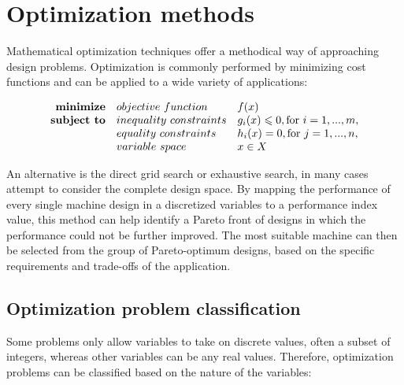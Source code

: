 \section{Optimization methods}                      \label{Chapter:background/optimization methods}
    
    
    Mathematical optimization techniques offer a methodical way of approaching design problems. Optimization is commonly performed by minimizing cost functions and can be applied to a wide variety of applications:
    
        
    \begin{equation}
        \begin{array}{rll}
            \textbf{minimize}       & \small{objective\,\,function}         & f(x)\\ 
            \textbf{subject to}     & \small{inequality\,\,constraints}     & g_i(x) \leqslant 0, \text{for } i= 1,...,m,\\ 
                                    & \small{equality\,\,constraints}       & h_i(x) = 0, \text{for } j= 1,...,n,\\ 
                                    & \small{variable\,\,space}             & x \in X
        \end{array}
    \end{equation}
    
    
    An alternative is the direct grid search or exhaustive search, in many cases attempt to consider the complete design space. By mapping the performance of every single machine design in a discretized variables to a performance index value, this method can help identify a Pareto front of designs in which the performance could not be further improved. The most suitable machine can then be selected from the group of Pareto-optimum designs, based on the specific requirements and trade-offs of the application.
    
    
    \subsection{Optimization problem classification}    \label{Chapter:background/optimization methods/optimization prob classification}

        
        Some problems only allow variables to take on discrete values, often a subset of integers, whereas other variables can be any real values. Therefore, optimization problems can be classified based on the nature of the variables:

